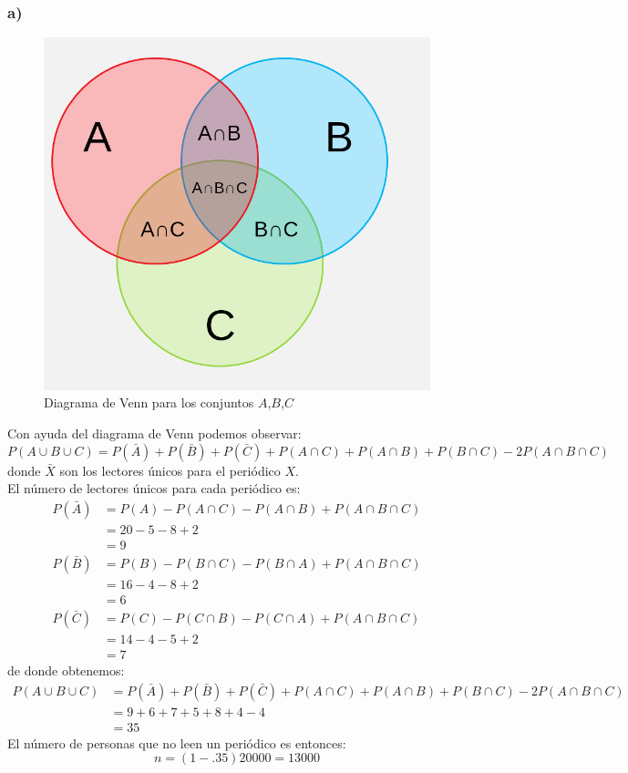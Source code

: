 \documentclass{article}
\begin{document}
\begin{tcolorbox}[breakable]
    \subsubsection*{a)}
    \begin{figure}[H]
        \centering
        \includegraphics[scale=0.3]{images/p1_venn.png}
        \caption{Diagrama de Venn para los conjuntos $A$,$B$,$C$}
    \end{figure}
    Con ayuda del diagrama de Venn podemos observar:
    \[ P(A \cup B \cup C) = P(\bar{A}) + P(\bar{B}) + P(\bar{C}) + P(A \cap C) + P(A \cap B) + P(B \cap C) - 2P(A \cap B \cap C) \]
    donde $\bar{X}$ son los lectores únicos para el periódico $X$. \\ 
    El número de lectores únicos para cada periódico es:
    \begin{align*}
        P(\bar{A}) 
        &= P(A) - P(A \cap C) - P(A \cap B) + P(A \cap B \cap C) \\
        &= 20 - 5 - 8 + 2 \\
        &= 9 \\
        P(\bar{B}) 
        &= P(B) - P(B \cap C) - P(B \cap A) + P(A \cap B \cap C) \\
        &= 16 - 4 - 8 + 2 \\
        &= 6 \\
        P(\bar{C})
        &= P(C) - P(C \cap B) - P(C \cap A) + P(A \cap B \cap C) \\
        &= 14 - 4 - 5 + 2 \\
        &= 7
    \end{align*}
    de donde obtenemos:
    \begin{align*}
        P(A \cup B \cup C) 
        &= P(\bar{A}) + P(\bar{B}) + P(\bar{C}) + P(A \cap C) + P(A \cap B) + P(B \cap C) - 2P(A \cap B \cap C) \\
        &= 9 + 6 + 7 + 5 + 8 + 4 - 4 \\
        &= 35
    \end{align*}
    El número de personas que no leen un periódico es entonces:
    \[ n = (1-.35)20000 = 13000 \]

\end{tcolorbox}
\end{document}
